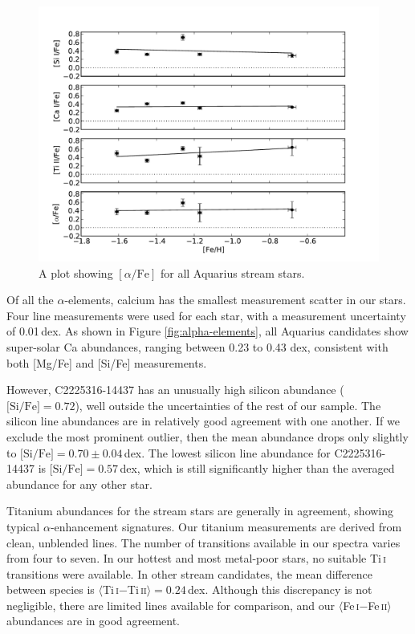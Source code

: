 \documentclass{emulateapj}
\begin{document}
\begin{figure}[h]
	\includegraphics[width=\columnwidth]{./figures/aquarius-alpha-fe.pdf}
	\caption{A plot showing $[\alpha/\mbox{Fe}]$ for all Aquarius stream stars.}
	\label{fig:alpha-fe}
\end{figure}

Of all the $\alpha$-elements, calcium has the smallest measurement scatter in our stars. Four line measurements were used for each star, with a measurement uncertainty of 0.01\,dex. As shown in Figure \ref{fig:alpha-elements}, all Aquarius candidates show super-solar Ca abundances, ranging between 0.23 to 0.43 dex, consistent with both [Mg/Fe] and [Si/Fe] measurements. 

However, C2225316-14437 has an unusually high silicon abundance ($\mbox{[Si/Fe]} = 0.72$), well outside the uncertainties of the rest of our sample. The silicon line abundances are in relatively good agreement with one another. If we exclude the most prominent outlier, then the mean abundance drops only slightly to $\mbox{[Si/Fe]} = 0.70 \pm 0.04$\,dex. The lowest silicon line abundance for C2225316-14437 is $\mbox{[Si/Fe]} = 0.57$\,dex, which is still significantly higher than the averaged abundance for any other star.

Titanium abundances for the stream stars are generally in agreement, showing typical $\alpha$-enhancement signatures. Our titanium measurements are derived from clean, unblended lines. The number of transitions available in our spectra varies from four to seven. In our hottest and most metal-poor stars, no suitable Ti\,\textsc{i} transitions were available. In other stream candidates, the mean difference between species is $\langle$Ti\,\textsc{i}$ - $Ti\,\textsc{ii}$\rangle = 0.24$\,dex. Although this discrepancy is not negligible, there are limited lines available for comparison, and our $\langle$Fe\,\textsc{i}$ - $Fe\,\textsc{ii}$\rangle$ abundances are in good agreement.
\end{document}
